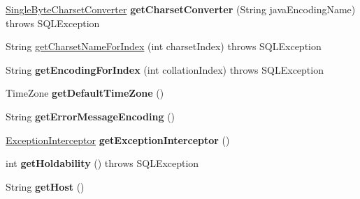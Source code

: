 \begin{DoxyCompactItemize}
\mbox{\hyperlink{classcom_1_1mysql_1_1jdbc_1_1_single_byte_charset_converter}{Single\+Byte\+Charset\+Converter}} {\bfseries get\+Charset\+Converter} (String java\+Encoding\+Name)  throws S\+Q\+L\+Exception 
\item 
String \mbox{\hyperlink{classcom_1_1mysql_1_1jdbc_1_1_multi_host_my_s_q_l_connection_a1f8af47fc87288b476e1fb532efecda0}{get\+Charset\+Name\+For\+Index}} (int charset\+Index)  throws S\+Q\+L\+Exception 
\item 
\mbox{\label{classcom_1_1mysql_1_1jdbc_1_1_multi_host_my_s_q_l_connection_a2876a15b62c4604a3ae8163fce7f58ca}} 
String {\bfseries get\+Encoding\+For\+Index} (int collation\+Index)  throws S\+Q\+L\+Exception 
\item 
\mbox{\label{classcom_1_1mysql_1_1jdbc_1_1_multi_host_my_s_q_l_connection_a3cffb22c6c48c41006a7e3d64c143daf}} 
Time\+Zone {\bfseries get\+Default\+Time\+Zone} ()
\item 
\mbox{\label{classcom_1_1mysql_1_1jdbc_1_1_multi_host_my_s_q_l_connection_add58c149250d6c5293139942017a1c42}} 
String {\bfseries get\+Error\+Message\+Encoding} ()
\item 
\mbox{\label{classcom_1_1mysql_1_1jdbc_1_1_multi_host_my_s_q_l_connection_af69e8eaa9d5d5ca40d40dc852bfc5ef6}} 
\mbox{\hyperlink{interfacecom_1_1mysql_1_1jdbc_1_1_exception_interceptor}{Exception\+Interceptor}} {\bfseries get\+Exception\+Interceptor} ()
\item 
\mbox{\label{classcom_1_1mysql_1_1jdbc_1_1_multi_host_my_s_q_l_connection_a630c29943fbfeafedbcf987a14508809}} 
int {\bfseries get\+Holdability} ()  throws S\+Q\+L\+Exception 
\item 
\mbox{\label{classcom_1_1mysql_1_1jdbc_1_1_multi_host_my_s_q_l_connection_af2715d3c776173ac342b4feddcf836d4}} 
String {\bfseries get\+Host} ()
\item 
\mbox{\label{classcom_1_1mysql_1_1jdbc_1_1_multi_host_my_s_q_l_connection_aeb5bf314b60d31b6177cfc441b2d72a1}} 

\end{DoxyCompactItemize}
